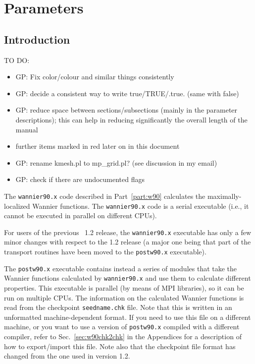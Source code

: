 \chapter{Parameters}

\section{Introduction}
{\color{red}
TO DO:
\begin{itemize}
\item GP: Fix color/colour and similar things consistently
\item GP: decide a consistent way to write true/TRUE/.true. (same with
  false)
\item GP: reduce space between sections/subsections (mainly in the
  parameter descriptions); this can help in reducing significantly the
  overall length of the manual
\item further items marked in red later on in this document
\item GP: rename kmesh.pl to mp\_grid.pl? (see discussion in my email)
\item GP: check if there are undocumented flags
\end{itemize}
}

The \texttt{wannier90.x} code described in Part~\ref{part:w90}
calculates the maximally-localized Wannier functions. The \texttt{wannier90.x} code is a
serial executable (i.e., it cannot be executed in parallel on different
CPUs).

For users of the previous \wannier\ 1.2 release, the
\texttt{wannier90.x} executable has only a few minor changes with
respect to the 1.2 release (a major one being that part of the
transport routines have been moved to the \texttt{postw90.x}
executable).

The \texttt{postw90.x} executable contains instead a series of modules
that take the Wannier functions calculated by \texttt{wannier90.x} and
use them to calculate different properties.  This executable is
parallel (by means of MPI libraries), so it can be run on multiple
CPUs.  The information on the calculated Wannier functions is read
from the checkpoint \verb|seedname.chk| file. Note that this is
written in an unformatted machine-dependent format. If you need to use
this file on a different machine, or you want to use a version of
\texttt{postw90.x} compiled with a different compiler, refer to
Sec.~\ref{sec:w90chk2chk} in the Appendices for a description of how
to export/import this file. Note also that the checkpoint file format has
changed from the one used in version 1.2.

